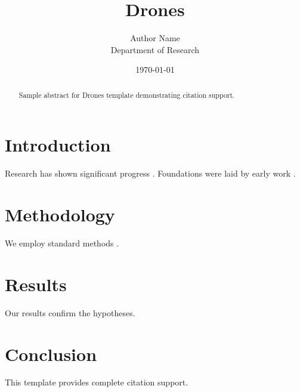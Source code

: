 \documentclass{mdpi}
\title{Drones}
\author{Author Name \\ \small Department of Research}
\date{\today}
\begin{document}
\maketitle

\begin{abstract}
Sample abstract for Drones template demonstrating citation support.
\end{abstract}

\section{Introduction}
Research has shown significant progress \citep{einstein1905}. Foundations were laid by early work \citep{turing1950}.

\section{Methodology}
We employ standard methods \citep{knuth1984}.

\section{Results}
Our results confirm the hypotheses.

\section{Conclusion}
This template provides complete citation support.



\end{document}
